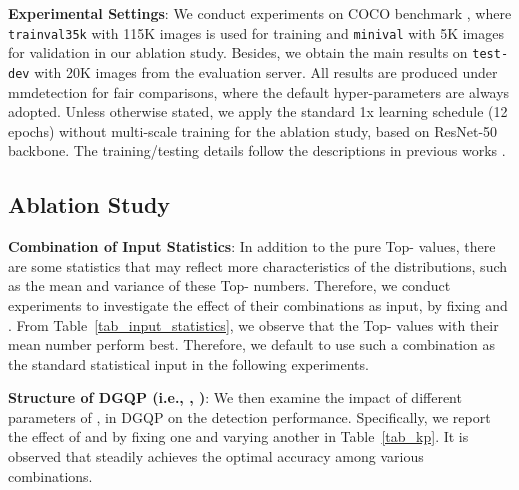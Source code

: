 \documentclass[10pt,twocolumn,letterpaper]{article}
\begin{document}
\noindent \textbf{Experimental Settings}: We conduct experiments on COCO benchmark \cite{lin2014microsoft}, where {\tt  trainval35k} with 115K images is used for training and {\tt minival} with 5K images for validation in our ablation study. Besides, we obtain the main results on {\tt test-dev} with 20K images from the evaluation server. All results are produced under mmdetection \cite{chen2019mmdetection} for fair comparisons, where the default hyper-parameters are always adopted. Unless otherwise stated, we apply the standard 1x learning schedule (12 epochs) without multi-scale training for the ablation study, based on ResNet-50 \cite{he2016deep} backbone. The training/testing details follow the descriptions in previous works \cite{li2020generalized,chen2020reppoints}.





\subsection{Ablation Study}
\noindent \textbf{Combination of Input Statistics}: In addition to the pure Top- values, there are some statistics that may reflect more characteristics of the distributions, such as the mean and variance of these Top- numbers. Therefore, we conduct experiments to investigate the effect of their combinations as input, by fixing  and . From Table~\ref{tab_input_statistics}, we observe that the Top- values with their mean number perform best. Therefore, we default to use such a combination as the standard statistical input in the following experiments.





\noindent \textbf{Structure of DGQP (i.e., , )}: We then examine the impact of different parameters of ,  in DGQP on the detection performance. Specifically, we report the effect of  and  by fixing one and varying another in Table~\ref{tab_kp}. It is observed that  steadily achieves the optimal accuracy among various combinations.
\end{document}
